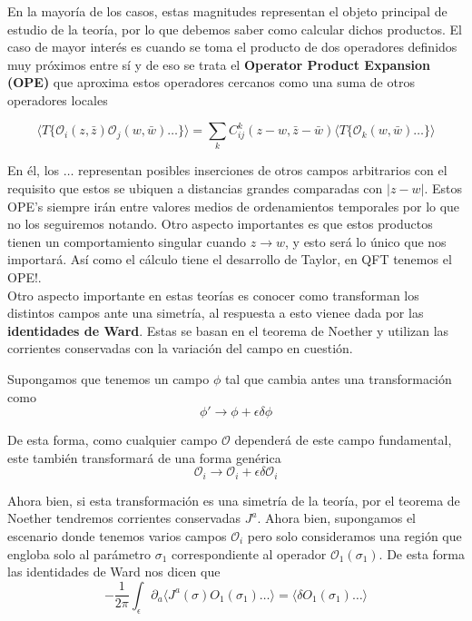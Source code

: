 \documentclass[]{article}
\begin{document}
\noindent En la mayoría de los casos, estas magnitudes representan el objeto principal de estudio de la teoría, por lo que debemos saber como calcular dichos productos. El caso de mayor interés es cuando se toma el producto de dos operadores definidos muy próximos entre sí y de eso se trata el  \textbf{Operator Product Expansion (OPE)} que aproxima estos operadores cercanos como una suma de otros operadores locales

\begin{equation}\label{OPE}
\langle T\{\mathcal{O}_i(z,\bar{z})\mathcal{O}_j(w,\bar{w})\dots\}\rangle=
\sum_k C^k_{ij}(z-w,\bar{z}-\bar{w})\langle T\{\mathcal{O}_k(w,\bar{w})\dots\}\rangle
\end{equation}
 
En él, los $\dots$  representan posibles inserciones de otros campos arbitrarios con el requisito que estos se ubiquen a distancias grandes comparadas con $|z-w|$. Estos OPE's siempre irán entre valores medios de ordenamientos temporales por lo que no los seguiremos notando. Otro aspecto importantes es que estos productos tienen un comportamiento singular cuando $z \rightarrow w$, y esto será lo único que nos importará. Así como el cálculo tiene el desarrollo de Taylor, en QFT tenemos el OPE!.\\


Otro aspecto importante en estas teorías es conocer como transforman los distintos campos ante una simetría, al respuesta a esto vienee dada por las \textbf{identidades de Ward}. Estas se basan en el teorema de Noether y utilizan las corrientes conservadas con la variación del campo en cuestión.

Supongamos que tenemos un campo $\phi$ tal que cambia antes una transformación como
\begin{equation}
\phi' \rightarrow \phi + \epsilon\delta\phi
\end{equation}

De esta forma, como cualquier campo $\mathcal{O} $ dependerá de este campo fundamental, este también transformará de una forma genérica 
\begin{equation}\label{key}
\mathcal{O}_i \rightarrow \mathcal{O}_i + \epsilon\delta \mathcal{O}_i
\end{equation}

Ahora bien, si esta transformación es una simetría de la teoría, por el teorema de Noether tendremos corrientes conservadas $ J^{a}$. Ahora bien, supongamos el escenario donde tenemos varios campos $ \mathcal{O}_i $ pero solo consideramos una región que engloba solo al parámetro $\sigma_1$ correspondiente al operador $\mathcal{O}_1(\sigma_1) $. De esta forma las identidades de Ward nos dicen que 
\begin{equation}\label{Ward}
 -\frac{1}{2\pi}\int_{\epsilon}\partial_a\langle J^a(\sigma) O_1(\sigma_1)\dots \rangle = \langle \delta O_1(\sigma_1)\dots\rangle
\end{equation}
\end{document}
